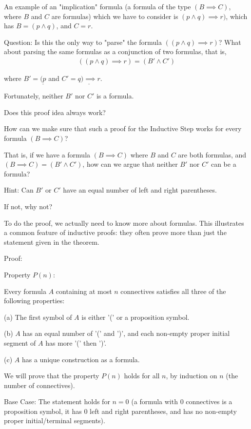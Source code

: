 \documentclass{article}
\begin{document}
An example of an "implication" formula (a formula of the type $(B \implies C)$, where $B$ and $C$ are formulas) which we have to consider is $(p \wedge q) \implies r)$, which has $B = (p \wedge q)$, and $C = r$. 

Question: Is this the only way to "parse" the formula $((p \wedge q) \implies r)$? What about parsing the same formulas as a conjunction of two formulas, that is, 
\begin{align*}
((p \wedge q) \implies r) = (B' \wedge C')
\end{align*}

where $B' =\underline{(p}$ and $C'= \underline{q) \implies r}$. 

Fortunately, neither $B'$ nor $C'$ is a formula. 

Does this proof idea always work?

How can we make sure that such a proof for the Inductive Step works for every formula $(B \implies C)$?

That is, if we have a formula $(B \implies C)$ where $B$ and $C$ are both formulas, and $(B \implies C) = (B' \wedge C')$, how can we argue that neither $B'$ nor $C'$ can be a formula? 

Hint: Can $B'$ or $C'$ have an equal number of left and right parentheses. 

If not, why not? 

To do the proof, we actually need to know more about formulas. This illustrates a common feature of inductive proofs: they often prove more than just the statement given in the theorem. 

Proof:

Property $P(n)$:

Every formula $A$ containing at most $n$ connectives satisfies all three of the following properties:

(a) The first symbol of $A$ is either '(' or a proposition symbol.

(b) $A$ has an equal number of '(' and ')', and each non-empty proper initial segment of $A$ has more '(' then ')'. 

(c) $A$ has a unique construction as a formula. 

We will prove that the property $P(n)$ holds for all $n$, by induction on $n$ (the number of connectives). 

Base Case: The statement holds for $n=0$ (a formula with $0$ connectives is a proposition symbol, it has $0$ left and right parentheses, and has no non-empty proper initial/terminal segments). 
\end{document}
